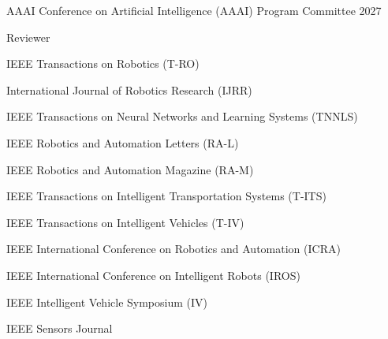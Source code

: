 \begin{cventries}
    \vspace{3mm}

  \cventry
    {AAAI Conference on Artificial Intelligence (AAAI)}
    {Program Committee}
    {}{2027}{}

    \vspace{3mm}

  \cventry
    {} %
    {Reviewer} %
    {} %
    {} %
    {
      \begin{cvitems} %
        \item {IEEE Transactions on Robotics (T-RO)}
        \item {International Journal of Robotics Research (IJRR)}
        \item {IEEE Transactions on Neural Networks and Learning Systems (TNNLS)}
        \item {IEEE Robotics and Automation Letters (RA-L)}
        \item {IEEE Robotics and Automation Magazine (RA-M)}
        \item {IEEE Transactions on Intelligent Transportation Systems (T-ITS)}
        \item {IEEE Transactions on Intelligent Vehicles (T-IV)}
        \item {IEEE International Conference on Robotics and Automation (ICRA)}
        \item {IEEE International Conference on Intelligent Robots (IROS)}
        \item {IEEE Intelligent Vehicle Symposium (IV)}
        \item {IEEE Sensors Journal}
      \end{cvitems}
    }

\end{cventries}
